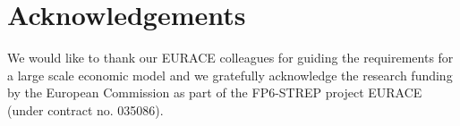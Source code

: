 \documentclass{aamas2009}
\begin{document}


\section{Acknowledgements}
We would like to thank our EURACE colleagues for guiding the requirements for a
large scale economic model and
we gratefully acknowledge the research funding by the European Commission as
part of the FP6-STREP project EURACE (under contract no. 035086).

%

%
%
\end{document}
